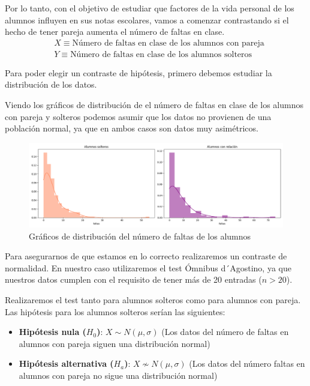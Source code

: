 Por lo tanto, con el objetivo de estudiar que factores de la vida personal de los alumnos influyen en sus notas escolares, vamos a comenzar contrastando si el hecho de tener pareja aumenta el número de faltas en clase.
\begin{equation*}
    \begin{split}
        & X \equiv \text{Número de faltas en clase de los alumnos con pareja}\\
        & Y \equiv \text{Número de faltas en clase de los alumnos solteros}
    \end{split} 
\end{equation*}

\pagebreak

Para poder elegir un contraste de hipótesis, primero debemos estudiar la distribución de los datos.

Viendo los gráficos de distribución de el número de faltas en clase de los alumnos con pareja y solteros podemos asumir que los datos no provienen de una población normal, ya que en ambos casos son datos muy asimétricos.

\begin{figure}[H]
    \centering
    \includegraphics[width=1\textwidth]{./figures/distribucion-numero-faltas.png}
    \caption{Gráficos de distribución del número de faltas de los alumnos}
    \label{fig:dist-num-faltas}
\end{figure}

Para asegurarnos de que estamos en lo correcto realizaremos un contraste de normalidad. En nuestro caso utilizaremos el test Ómnibus d´Agostino, ya que nuestros datos cumplen con el requisito de tener más de 20 entradas ($n>20$).

Realizaremos el test tanto para alumnos solteros como para alumnos con pareja. Las hipótesis para los alumnos solteros serían las siguientes:

\begin{itemize}
    \item \textbf{Hipótesis nula ($H_0$)}: $X \sim N(\mu, \sigma)$ (Los datos del número de faltas en alumnos con pareja siguen una distribución normal)
    \item \textbf{Hipótesis alternativa ($H_a$)}: $X \not \sim N(\mu, \sigma)$ (Los datos del número faltas en alumnos con pareja no sigue una distribución normal)
\end{itemize}

